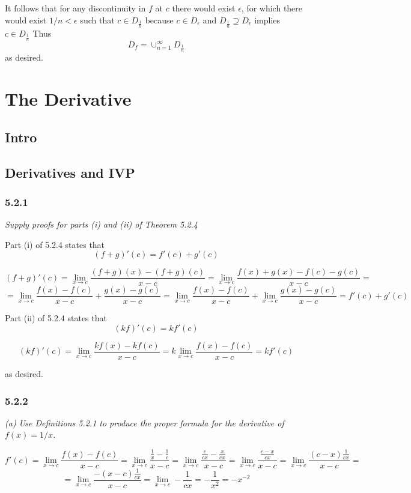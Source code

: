 \documentclass[11pt,oneside,titlepage]{book}
\begin{document}
It follows that for any discontinuity in $f$  at $c$
there would exist $\epsilon$, for which there would exist $1/n < \epsilon$
such that $c \in D_{\frac 1 n}$ because
$c \in D_{\epsilon}$ and $D_{\frac 1 n} \supseteq D_\epsilon$ implies
$c \in  D_{\frac 1 n}$ Thus
$$D_f = \cup_{n = 1}^{\infty}D_{\frac 1 n }$$
as desired.

\chapter{The Derivative}

\section{Intro}

\section{Derivatives and IVP}

\subsection*{5.2.1}
\textit{Supply proofs for parts (i) and (ii) of Theorem 5.2.4}

Part (i)  of 5.2.4 states that
$$(f + g)'(c) = f'(c) + g'(c)$$

$$(f + g)'(c) = \lim_{x \to c}\frac{(f + g)(x) - (f + g)(c)}{x - c} 
= \lim_{x \to c}\frac{f(x) + g(x) - f(c) - g(c)}{x - c} = $$
$$=  \lim_{x \to c}\frac{f(x) - f(c)}{x - c} + \frac{g(x) - g(c)}{x - c} =
\lim_{x \to c}\frac{f(x) - f(c)}{x - c} +
\lim_{x \to c}\frac{g(x) - g(c)}{x - c} = f'(c) + g'(c)
$$

Part (ii) of 5.2.4 states that
$$(kf)'(c) = kf'(c)$$

$$(kf)'(c) = \lim_{x \to c}\frac{kf(x) - kf(c)}{x - c} =
k \lim_{x \to c}\frac{f(x) - f(c)}{x - c} = k f'(c)$$

as desired.

\subsection*{5.2.2}
\textit{(a) Use Definitions 5.2.1 to produce the proper formula for the
  derivative of $f(x) = 1/x$.}

$$f'(c) = \lim_{x \to c}\frac{f(x) - f(c)}{x - c} =
\lim_{x \to c}\frac{\frac 1 x  - \frac 1 c}{x - c} =
\lim_{x \to c}\frac{\frac{c}{cx}  - \frac{x}{cx}}{x - c} =
\lim_{x \to c}\frac{\frac{c - x}{cx}}{x - c} =
\lim_{x \to c}\frac{(c - x)\frac{1}{cx}}{x - c} =$$
$$ = \lim_{x \to c}\frac{- (x - c)\frac{1}{cx}}{x - c} =
\lim_{x \to c} - \frac{1}{cx} =  - \frac{1}{x^2} = - x^{-2}$$
\end{document}
